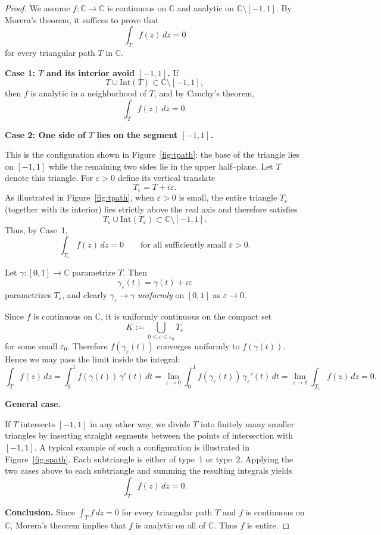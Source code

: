 \documentclass[12pt, a4paper]{report}
\theoremstyle{spaced}
\begin{document}
\begin{proof}
	We assume $f:\mathbb{C}\to\mathbb{C}$ is continuous on $\mathbb{C}$ and analytic on
	$\mathbb{C}\setminus[-1,1]$.
	By Morera’s theorem, it suffices to prove that
	\[
		\int_T f(z)\,dz = 0
	\]
	for every triangular path $T$ in $\mathbb{C}$.

	\medskip
	\noindent\textbf{Case 1: $T$ and its interior avoid $[-1,1]$.}
	If
	\[
		T \cup \mathrm{Int}(T) \subset \mathbb{C}\setminus[-1,1],
	\]
	then $f$ is analytic in a neighborhood of $T$, and by Cauchy’s theorem,
	\[
		\int_T f(z)\,dz = 0.
	\]

	\medskip
	\noindent\textbf{Case 2: One side of $T$ lies on the segment $[-1,1]$.}

	This is the configuration shown in Figure~\ref{fig:tpath}:
	the base of the triangle lies on $[-1,1]$ while the remaining two sides lie in the upper half–plane.
	Let $T$ denote this triangle.
	For $\varepsilon>0$ define its vertical translate
	\[
		T_\varepsilon = T + i\varepsilon.
	\]
	As illustrated in Figure~\ref{fig:tpath}, when $\varepsilon>0$ is small,
	the entire triangle $T_\varepsilon$ (together with its interior) lies strictly above the real axis and therefore satisfies
	\[
		T_\varepsilon \cup \mathrm{Int}(T_\varepsilon)
		\subset\mathbb{C}\setminus[-1,1].
	\]
	Thus, by Case~1,
	\[
		\int_{T_\varepsilon} f(z)\,dz = 0
		\qquad\text{for all sufficiently small }\varepsilon>0.
	\]

	Let $\gamma:[0,1]\to\mathbb{C}$ parametrize $T$.
	Then
	\[
		\gamma_\varepsilon(t)=\gamma(t)+i\varepsilon
	\]
	parametrizes $T_\varepsilon$, and clearly $\gamma_\varepsilon\to\gamma$
	\emph{uniformly} on $[0,1]$ as $\varepsilon\to 0$.

	Since $f$ is continuous on $\mathbb{C}$, it is uniformly continuous on the compact set
	\[
		K:=\bigcup_{0\le\varepsilon\le\varepsilon_0} T_\varepsilon
	\]
	for some small $\varepsilon_0$.
	Therefore $f(\gamma_\varepsilon(t))$ converges uniformly to $f(\gamma(t))$.
	Hence we may pass the limit inside the integral:
	\[
		\int_T f(z)\,dz
		= \int_0^1 f(\gamma(t))\,\gamma'(t)\,dt
		= \lim_{\varepsilon\to 0}\int_0^1 f(\gamma_\varepsilon(t))\,\gamma_\varepsilon'(t)\,dt
		= \lim_{\varepsilon\to 0} \int_{T_\varepsilon} f(z)\,dz = 0.
	\]

	\medskip
	\noindent\textbf{General case.}

	If $T$ intersects $[-1,1]$ in any other way, we divide $T$ into finitely many smaller triangles by inserting straight segments between the points of intersection with $[-1,1]$. A typical example of such a configuration is illustrated in
	Figure~\ref{fig:spath}.
	Each subtriangle is either of type~1 or type~2.
	Applying the two cases above to each subtriangle and summing the resulting integrals yields
	\[
		\int_T f(z)\,dz = 0.
	\]

	\medskip
	\noindent\textbf{Conclusion.}
	Since $\int_T f\,dz=0$ for every triangular path $T$ and $f$ is continuous on $\mathbb{C}$,
	Morera’s theorem implies that $f$ is analytic on all of $\mathbb{C}$.
	Thus $f$ is entire.
\end{proof}
\end{document}
